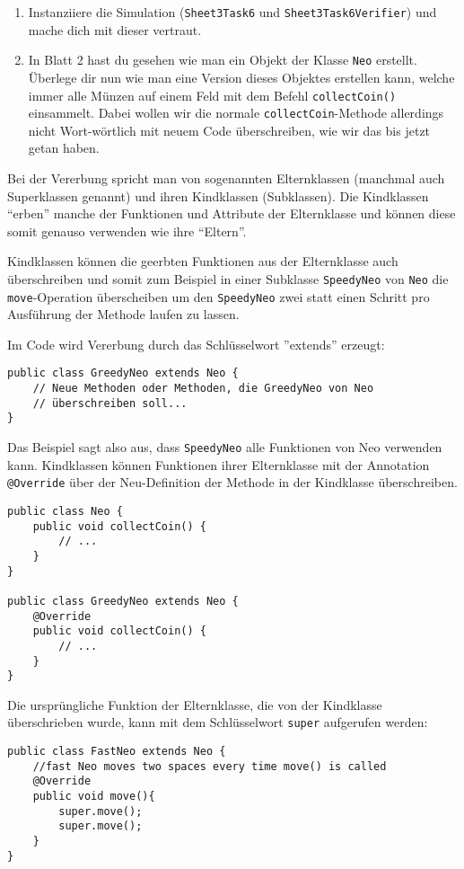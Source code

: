 \begin{enumerate}
	\item
	Instanziiere die Simulation (\lstinline{Sheet3Task6} und \lstinline{Sheet3Task6Verifier}) und mache dich mit dieser vertraut.

\item In Blatt 2 hast du gesehen wie man ein Objekt der Klasse \lstinline{Neo} erstellt.
Überlege dir nun wie man eine Version dieses Objektes erstellen kann, welche immer alle Münzen auf einem Feld mit dem Befehl \lstinline{collectCoin()} einsammelt.
Dabei wollen wir die normale \lstinline{collectCoin}-Methode allerdings nicht Wort-wörtlich mit neuem Code überschreiben, wie wir das bis jetzt getan haben.
\end{enumerate}

\begin{Infobox}[Vererbung]

Bei der Vererbung spricht man von sogenannten Elternklassen (manchmal auch Superklassen genannt) und ihren Kindklassen (Subklassen).
Die Kindklassen \enquote{erben} manche der Funktionen und Attribute der Elternklasse und können diese somit genauso verwenden wie ihre \enquote{Eltern}.\newline

Kindklassen können die geerbten Funktionen aus der Elternklasse auch überschreiben und somit zum Beispiel in einer Subklasse \lstinline{SpeedyNeo} von \lstinline{Neo} die \lstinline{move}-Operation überscheiben um den \lstinline{SpeedyNeo} zwei statt einen Schritt pro Ausführung der Methode laufen zu lassen.

Im Code wird Vererbung durch das Schlüsselwort ''extends'' erzeugt:

\begin{lstlisting}[xleftmargin=0.5cm]
public class GreedyNeo extends Neo {
	// Neue Methoden oder Methoden, die GreedyNeo von Neo
	// überschreiben soll...
}
\end{lstlisting}

Das Beispiel sagt also aus, dass \lstinline{SpeedyNeo} alle Funktionen von Neo verwenden kann.\newline
Kindklassen können Funktionen ihrer Elternklasse mit der Annotation \lstinline{@Override} über der Neu-Definition der Methode in der Kindklasse überschreiben.

\begin{lstlisting}[xleftmargin=0.5cm]
public class Neo {
	public void collectCoin() {
		// ...
	}
}

public class GreedyNeo extends Neo {
	@Override
	public void collectCoin() {
		// ...
	}
}
\end{lstlisting}
Die ursprüngliche Funktion der Elternklasse, die von der Kindklasse überschrieben wurde, kann mit dem Schlüsselwort \lstinline{super} aufgerufen werden:
\begin{lstlisting}[xleftmargin=0.5cm]
public class FastNeo extends Neo {
	//fast Neo moves two spaces every time move() is called
	@Override
	public void move(){
		super.move();
		super.move();
	}
}
\end{lstlisting}
\end{Infobox}


